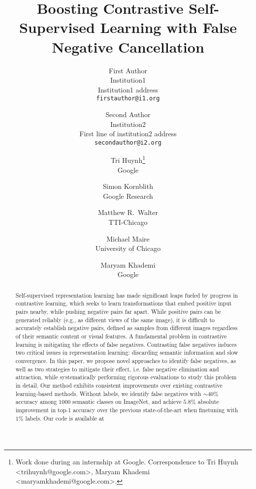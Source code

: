 \documentclass[10pt,twocolumn,letterpaper]{article}
\begin{document}
\title{Boosting Contrastive Self-Supervised Learning with False Negative Cancellation}

\author{First Author\\
Institution1\\
Institution1 address\\
{\tt\small firstauthor@i1.org}
\and
Second Author\\
Institution2\\
First line of institution2 address\\
{\tt\small secondauthor@i2.org}
}

\author{\normalsize Tri Huynh\thanks{Work done during an internship at Google. Correspondence to Tri Huynh <trihuynh@google.com>, Maryam Khademi <maryamkhademi@google.com>.} \\ \small Google \and \normalsize Simon Kornblith \\ \small Google Research \and \normalsize Matthew R.\ Walter \\ \small TTI-Chicago \and \normalsize Michael Maire \\ \small University of Chicago \and \normalsize Maryam Khademi \\ \small Google}

\maketitle

\ifwacvfinal
\thispagestyle{empty}
\fi

\begin{abstract}
Self-supervised representation learning has made significant leaps fueled by progress in contrastive learning, which seeks to learn transformations that embed positive input pairs nearby, while pushing negative pairs far apart. While positive pairs can be generated reliably (e.g., as different views of the same image), it is difficult to accurately establish negative pairs, defined as samples from different images regardless of their semantic content or visual features. A fundamental problem in contrastive learning is mitigating the effects of false negatives. Contrasting false negatives induces two critical issues in representation learning: discarding semantic information and slow convergence. In this paper, we propose novel approaches to identify false negatives, as well as two strategies to mitigate their effect, i.e. false negative elimination and attraction,
while systematically performing rigorous evaluations to study this problem in detail. Our method exhibits consistent improvements over existing contrastive learning-based methods. Without labels, we identify false negatives with $\sim$$40\%$ accuracy among $1000$ semantic classes on ImageNet, and achieve $5.8\%$ absolute improvement in top-1 accuracy over the previous state-of-the-art when finetuning with $1\%$ labels. Our code is available at \href{https://github.com/google-research/fnc}{\color{red}{https://github.com/google-research/fnc}}
\end{abstract}
 \vspace{-15pt}
\end{document}
